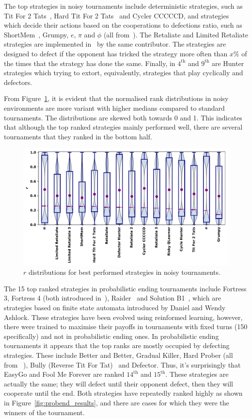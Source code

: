 \documentclass{article}
\begin{document}
The top strategies in noisy tournaments include deterministic strategies, such
as Tit For 2 Tats~\cite{Axelrod1980b}, Hard Tit For 2 Tats~\cite{Stewart2012}
and Cycler CCCCCD, and strategies which decide their actions based on the
cooperations to defections ratio, such as ShortMem~\cite{Carvalho2013}, Grumpy,
$e$, $\pi$ and $\phi$ (all from~\cite{axelrodproject}). The Retaliate and
Limited Retaliate strategies are implemented in~\cite{axelrodproject} by the
same contributor. The strategies are designed to defect if the opponent has
tricked the strategy more often than \(x\%\) of the times that the strategy has
done the same. Finally, in $4^{\text{th}}$ and $9^{\text{th}}$ are Hunter
strategies which trying to extort, equivalently, strategies that play cyclically
and defectors.

From Figure~\ref{fig:noisy_results}, it is evident that the normalised rank
distributions in noisy environments are more variant with higher medians
compared to standard tournaments. The distributions are skewed both towards 0
and 1. This indicates that although the top ranked strategies mainly performed
well, there are several tournaments that they ranked in the bottom half.

\begin{figure}[!htbp]
    \centering
    \includegraphics[width=.55\textwidth]{../images/performance_noise.pdf}
    \caption{\(r\) distributions for best performed strategies in noisy tournaments.}
    \label{fig:noisy_results}
\end{figure}

The 15 top ranked strategies in probabilistic ending tournaments include
Fortress 3, Fortress 4 (both introduced in~\cite{Ashlock2006}),
Raider~\cite{Ashlock2014} and Solution B1~\cite{Ashlock2014}, which are
strategies based on finite state automata introduced by Daniel and Wendy
Ashlock. These strategies have been evolved using reinformed learning, however,
there were trained to maximise their payoffs in tournaments with fixed turns
(150 specifically) and not in probabilistic ending ones. In probabilistic ending
tournaments it appears that the top ranks are mostly occupied by defecting
strategies. These include Better and Better, Gradual Killer, Hard Prober (all
from ~\cite{prison}), Bully (Reverse Tit For Tat)~\cite{Nachbar1992} and
Defector. Thus, it's surprisingly that EasyGo and Fool Me Forever are ranked
$14^{\text{th}}$ and $15^{\text{th}}$. These strategies are actually the same;
they will defect until their opponent defect, then they will cooperate until the
end. Both strategies have repeatedly ranked highly as shown in
Figure~\ref{fig:probend_results}, and there are cases for which they were the
winners of the tournament.
\end{document}
